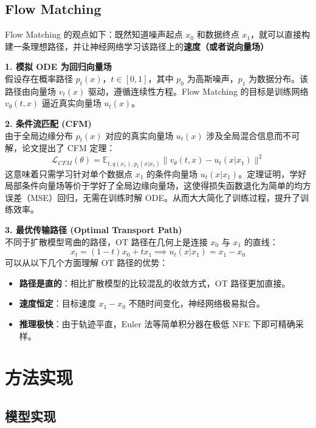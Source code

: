 \documentclass[11pt,a4paper]{article}
\begin{document}
\subsection{Flow Matching}

Flow Matching \cite{lipman2023flow} 的观点如下：既然知道噪声起点 $x_0$ 和数据终点 $x_1$，就可以直接构建一条理想路径，并让神经网络学习该路径上的\textbf{速度（或者说向量场）}

\textbf{1. 模拟 ODE 为回归向量场} \\
假设存在概率路径 $p_t(x)$，$t \in [0, 1]$，其中 $p_0$ 为高斯噪声，$p_1$ 为数据分布。该路径由向量场 $v_t(x)$ 驱动，遵循连续性方程。Flow Matching 的目标是训练网络 $v_\theta(t, x)$ 逼近真实向量场 $u_t(x)$。

\textbf{2. 条件流匹配 (CFM)} \\
由于全局边缘分布 $p_t(x)$ 对应的真实向量场 $u_t(x)$ 涉及全局混合信息而不可解，论文提出了 CFM 定理：
\begin{equation}
\mathcal{L}_{CFM}(\theta) = \mathbb{E}_{t, q(x_1), p_t(x|x_1)} \| v_\theta(t, x) - u_t(x|x_1) \|^2
\end{equation}
这意味着只需学习针对单个数据点 $x_1$ 的条件向量场 $u_t(x|x_1)$。定理证明，学好局部条件向量场等价于学好了全局边缘向量场，这使得损失函数退化为简单的均方误差（MSE）回归，无需在训练时解 ODE。从而大大简化了训练过程，提升了训练效率。

\textbf{3. 最优传输路径 (Optimal Transport Path)} \\
不同于扩散模型弯曲的路径，OT 路径在几何上是连接 $x_0$ 与 $x_1$ 的直线：
\begin{equation}
x_t = (1 - t)x_0 + t x_1 \implies u_t(x|x_1) = x_1 - x_0
\end{equation}
可以从以下几个方面理解 OT 路径的优势：
\begin{itemize}
    \item \textbf{路径是直的}：相比扩散模型的比较混乱的收敛方式，OT 路径更加直接。
    \item \textbf{速度恒定}：目标速度 $x_1 - x_0$ 不随时间变化，神经网络极易拟合。
    \item \textbf{推理极快}：由于轨迹平直，Euler 法等简单积分器在极低 NFE 下即可精确采样。
\end{itemize}

\section{方法实现}
\label{sec:method}

\subsection{模型实现}
\end{document}
